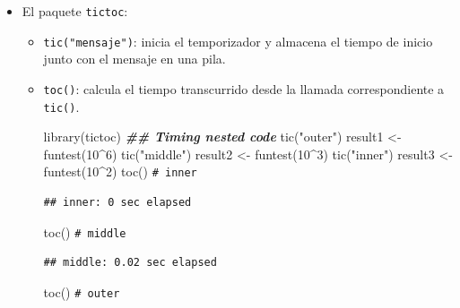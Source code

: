 \documentclass[
]{book}
\newenvironment{Shaded}{\begin{snugshade}}{\end{snugshade}}
\newcommand{\CommentTok}[1]{\textcolor[rgb]{0.56,0.35,0.01}{\textit{#1}}}
\newcommand{\DecValTok}[1]{\textcolor[rgb]{0.00,0.00,0.81}{#1}}
\newcommand{\DocumentationTok}[1]{\textcolor[rgb]{0.56,0.35,0.01}{\textbf{\textit{#1}}}}
\newcommand{\FunctionTok}[1]{\textcolor[rgb]{0.00,0.00,0.00}{#1}}
\newcommand{\NormalTok}[1]{#1}
\newcommand{\OtherTok}[1]{\textcolor[rgb]{0.56,0.35,0.01}{#1}}
\newcommand{\SpecialCharTok}[1]{\textcolor[rgb]{0.00,0.00,0.00}{#1}}
\newcommand{\StringTok}[1]{\textcolor[rgb]{0.31,0.60,0.02}{#1}}
\theoremstyle{break}
\theoremstyle{nonumberplain}
\renewcommand{\CommentTok}[1]{\textcolor[rgb]{0.41,0.41,0.41}{\texttt{#1}}}
\begin{document}
\begin{itemize}
\item
  El paquete \texttt{tictoc}:

  \begin{itemize}
  \item
    \texttt{tic("mensaje")}: inicia el temporizador y almacena el tiempo de inicio junto con el mensaje en una pila.
  \item
    \texttt{toc()}: calcula el tiempo transcurrido desde la llamada correspondiente a \texttt{tic()}.

\begin{Shaded}
\begin{Highlighting}[]
\FunctionTok{library}\NormalTok{(tictoc)}
\DocumentationTok{\#\# Timing nested code}
\FunctionTok{tic}\NormalTok{(}\StringTok{"outer"}\NormalTok{)}
\NormalTok{   result1 }\OtherTok{\textless{}{-}} \FunctionTok{funtest}\NormalTok{(}\DecValTok{10}\SpecialCharTok{\^{}}\DecValTok{6}\NormalTok{)}
   \FunctionTok{tic}\NormalTok{(}\StringTok{"middle"}\NormalTok{)}
\NormalTok{      result2 }\OtherTok{\textless{}{-}} \FunctionTok{funtest}\NormalTok{(}\DecValTok{10}\SpecialCharTok{\^{}}\DecValTok{3}\NormalTok{)}
      \FunctionTok{tic}\NormalTok{(}\StringTok{"inner"}\NormalTok{)}
\NormalTok{         result3 }\OtherTok{\textless{}{-}} \FunctionTok{funtest}\NormalTok{(}\DecValTok{10}\SpecialCharTok{\^{}}\DecValTok{2}\NormalTok{)}
      \FunctionTok{toc}\NormalTok{() }\CommentTok{\# inner}
\end{Highlighting}
\end{Shaded}

\begin{verbatim}
## inner: 0 sec elapsed
\end{verbatim}

\begin{Shaded}
\begin{Highlighting}[]
   \FunctionTok{toc}\NormalTok{() }\CommentTok{\# middle}
\end{Highlighting}
\end{Shaded}

\begin{verbatim}
## middle: 0.02 sec elapsed
\end{verbatim}

\begin{Shaded}
\begin{Highlighting}[]
\FunctionTok{toc}\NormalTok{() }\CommentTok{\# outer}
\end{Highlighting}
\end{Shaded}


\end{itemize}
\end{itemize}
\end{document}
